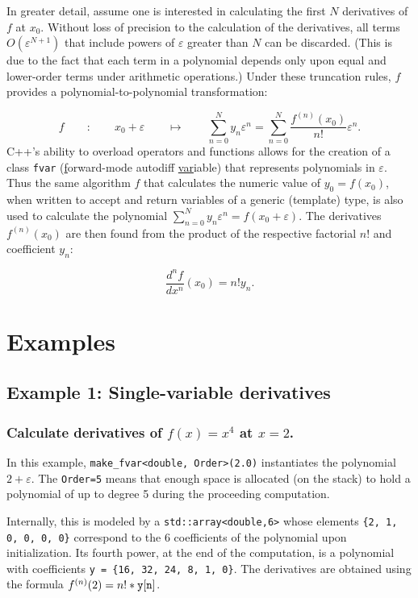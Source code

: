 \documentclass{article}
\begin{document}
In greater detail, assume one is interested in calculating the first $N$ derivatives of $f$ at $x_0$. Without loss
of precision to the calculation of the derivatives, all terms $O\left(\varepsilon^{N+1}\right)$ that include powers
of $\varepsilon$ greater than $N$ can be discarded. (This is due to the fact that each term in a polynomial depends
only upon equal and lower-order terms under arithmetic operations.) Under these truncation rules, $f$ provides a
polynomial-to-polynomial transformation:

\[
f \qquad : \qquad x_0+\varepsilon \qquad \mapsto \qquad
    \sum_{n=0}^Ny_n\varepsilon^n=\sum_{n=0}^N\frac{f^{(n)}(x_0)}{n!}\varepsilon^n.
\]
C++'s ability to overload operators and functions allows for the creation of a class {\tt fvar}
(\underline{f}orward-mode autodiff \underline{var}iable) that represents polynomials in $\varepsilon$. Thus
the same algorithm $f$ that calculates the numeric value of $y_0=f(x_0)$, when
written to accept and return variables of a generic (template) type, is also used to calculate the polynomial
$\sum_{n=0}^Ny_n\varepsilon^n=f(x_0+\varepsilon)$. The derivatives $f^{(n)}(x_0)$ are then found from the
product of the respective factorial $n!$ and coefficient $y_n$:

\[ \frac{d^nf}{dx^n}(x_0)=n!y_n. \]

\section{Examples}

\subsection{Example 1: Single-variable derivatives}

\subsubsection{Calculate derivatives of $f(x)=x^4$ at $x=2$.}

In this example, {\tt make\_fvar<double, Order>(2.0)} instantiates the polynomial $2+\varepsilon$. The {\tt Order=5}
means that enough space is allocated (on the stack) to hold a polynomial of up to degree 5 during the proceeding
computation.

Internally, this is modeled by a {\tt std::array<double,6>} whose elements {\tt \{2, 1, 0, 0, 0, 0\}} correspond
to the 6 coefficients of the polynomial upon initialization. Its fourth power, at the end of the computation, is
a polynomial with coefficients {\tt y = \{16, 32, 24, 8, 1, 0\}}.  The derivatives are obtained using the formula
$f^{(n)}(2)=n!*{\tt y[n]}$.
\end{document}
